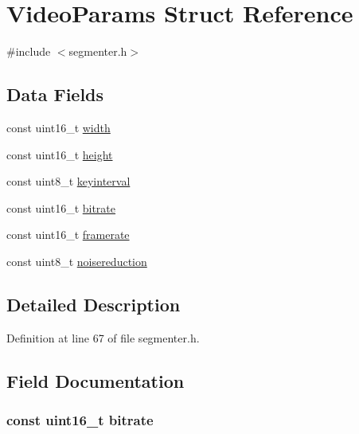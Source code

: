 \hypertarget{struct_video_params}{\section{\-Video\-Params \-Struct \-Reference}
\label{struct_video_params}
}


{\ttfamily \#include $<$segmenter.\-h$>$}

\subsection*{\-Data \-Fields}
\begin{DoxyCompactItemize}
\item 
const uint16\-\_\-t \hyperlink{struct_video_params_a9751eb6040d62275201c4b184f1657cf}{width}
\item 
const uint16\-\_\-t \hyperlink{struct_video_params_a08b719f21fdd4b4a8646070080cccbf9}{height}
\item 
const uint8\-\_\-t \hyperlink{struct_video_params_a742eca362410fabc25b1403e42afdf6f}{keyinterval}
\item 
const uint16\-\_\-t \hyperlink{struct_video_params_a90d9d9cc76bdecc14ce1bcda108dbc6c}{bitrate}
\item 
const uint16\-\_\-t \hyperlink{struct_video_params_a1d547da47827122cb857d138cd40d03d}{framerate}
\item 
const uint8\-\_\-t \hyperlink{struct_video_params_a55d36111de9687dc3e70d2aaeb13c47f}{noisereduction}
\end{DoxyCompactItemize}


\subsection{\-Detailed \-Description}


\-Definition at line 67 of file segmenter.\-h.



\subsection{\-Field \-Documentation}
\hypertarget{struct_video_params_a90d9d9cc76bdecc14ce1bcda108dbc6c}{
\subsubsection[{bitrate}]{\setlength{\rightskip}{0pt plus 5cm}const uint16\-\_\-t {\bf bitrate}}}\label{struct_video_params_a90d9d9cc76bdecc14ce1bcda108dbc6c}


